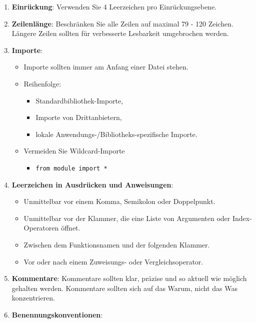 \documentclass{vorlage-design-main}
\begin{document}
\begin{enumerate}
\def\labelenumi{\arabic{enumi}.}
\item
  \textbf{Einrückung}: Verwenden Sie 4 Leerzeichen pro Einrückungsebene.
\item
  \textbf{Zeilenlänge}: Beschränken Sie alle Zeilen auf maximal 79 - 120
  Zeichen. Längere Zeilen sollten für verbesserte Lesbarkeit umgebrochen
  werden.
\item
  \textbf{Importe}:

  \begin{itemize}

  \item
    Importe sollten immer am Anfang einer Datei stehen.
  \item
    Reihenfolge:

    \begin{itemize}

    \item
      Standardbibliothek-Importe,
    \item
      Importe von Drittanbietern,
    \item
      lokale Anwendungs-/Bibliotheks-spezifische Importe.
    \end{itemize}
  \item
    Vermeiden Sie Wildcard-Importe

    \begin{itemize}

    \item
      \verb|from module import *|
    \end{itemize}
  \end{itemize}
\item
  \textbf{Leerzeichen in Ausdrücken und Anweisungen}:

  \begin{itemize}

  \item
    Unmittelbar vor einem Komma, Semikolon oder Doppelpunkt.
  \item
    Unmittelbar vor der Klammer, die eine Liste von Argumenten oder
    Index-Operatoren öffnet.
  \item
    Zwischen dem Funktionsnamen und der folgenden Klammer.
  \item
    Vor oder nach einem Zuweisungs- oder Vergleichsoperator.
  \end{itemize}
\item
  \textbf{Kommentare}: Kommentare sollten klar, präzise und so aktuell
  wie möglich gehalten werden. Kommentare sollten sich auf das Warum,
  nicht das Was konzentrieren.
\item
  \textbf{Benennungskonventionen}:


\end{enumerate}
\end{document}
